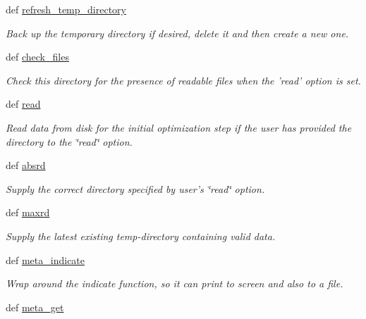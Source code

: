 \begin{DoxyCompactItemize}
\item 
def \hyperlink{classforcebalance_1_1target_1_1Target_afe815eafab06ac92f10bbf4b88ad95c8}{refresh\-\_\-temp\-\_\-directory}
\begin{DoxyCompactList}\small\item\em Back up the temporary directory if desired, delete it and then create a new one. \end{DoxyCompactList}\item 
def \hyperlink{classforcebalance_1_1target_1_1Target_ac790529c5f85f0547fe3601ad1cf2419}{check\-\_\-files}
\begin{DoxyCompactList}\small\item\em Check this directory for the presence of readable files when the 'read' option is set. \end{DoxyCompactList}\item 
def \hyperlink{classforcebalance_1_1target_1_1Target_afb87b4d33b88bb381c74b76752c5892a}{read}
\begin{DoxyCompactList}\small\item\em Read data from disk for the initial optimization step if the user has provided the directory to the \char`\"{}read\char`\"{} option. \end{DoxyCompactList}\item 
def \hyperlink{classforcebalance_1_1target_1_1Target_abb0a6089d8deaead8f78186cc8e4cbe4}{absrd}
\begin{DoxyCompactList}\small\item\em Supply the correct directory specified by user's \char`\"{}read\char`\"{} option. \end{DoxyCompactList}\item 
def \hyperlink{classforcebalance_1_1target_1_1Target_a961ce7e772836b1465cb44e3f03145df}{maxrd}
\begin{DoxyCompactList}\small\item\em Supply the latest existing temp-\/directory containing valid data. \end{DoxyCompactList}\item 
def \hyperlink{classforcebalance_1_1target_1_1Target_a99c84ef8ea504d7699c927e261f648e4}{meta\-\_\-indicate}
\begin{DoxyCompactList}\small\item\em Wrap around the indicate function, so it can print to screen and also to a file. \end{DoxyCompactList}\item 
def \hyperlink{classforcebalance_1_1target_1_1Target_a17c8ac0c7dd0a0430accddfd12602103}{meta\-\_\-get}

\end{DoxyCompactItemize}
